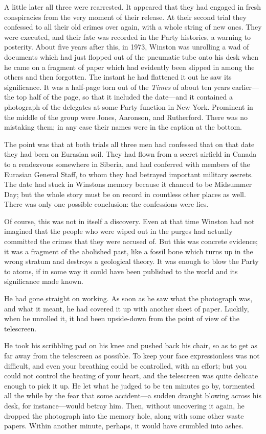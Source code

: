 A little later all three were rearrested. It appeared that they had
engaged in fresh conspiracies from the very moment of their release. At
their second trial they confessed to all their old crimes over again,
with a whole string of new ones. They were executed, and their fate was
recorded in the Party histories, a warning to posterity. About five
years after this, in 1973, Winston was unrolling a wad of documents
which had just flopped out of the pneumatic tube onto his desk when he
came on a fragment of paper which had evidently been slipped in among
the others and then forgotten. The instant he had flattened it out he
saw its significance. It was a half-page torn out of the \emph{Times} of
about ten years earlier---the top half of the page, so that it included
the date---and it contained a photograph of the delegates at some Party
function in New York. Prominent in the middle of the group were Jones,
Aaronson, and Rutherford. There was no mistaking them; in any case their
names were in the caption at the bottom.

The point was that at both trials all three men had confessed that on
that date they had been on Eurasian soil. They had flown from a secret
airfield in Canada to a rendezvous somewhere in Siberia, and had
conferred with members of the Eurasian General Staff, to whom they had
betrayed important military secrets. The date had stuck in
Winston\textquotesingle s memory because it chanced to be Midsummer Day;
but the whole story must be on record in countless other places as well.
There was only one possible conclusion: the confessions were lies.

Of course, this was not in itself a discovery. Even at that time Winston
had not imagined that the people who were wiped out in the purges had
actually committed the crimes that they were accused of. But this was
concrete evidence; it was a fragment of the abolished past, like a
fossil bone which turns up in the wrong stratum and destroys a
geological theory. It was enough to blow the Party to atoms, if in some
way it could have been published to the world and its significance made
known.

He had gone straight on working. As soon as he saw what the photograph
was, and what it meant, he had covered it up with another sheet of
paper. Luckily, when he unrolled it, it had been upside-down from the
point of view of the telescreen.

He took his scribbling pad on his knee and pushed back his chair, so as
to get as far away from the telescreen as possible. To keep your face
expressionless was not difficult, and even your breathing could be
controlled, with an effort; but you could not control the beating of
your heart, and the telescreen was quite delicate enough to pick it up.
He let what he judged to be ten minutes go by, tormented all the while
by the fear that some accident---a sudden draught blowing across his
desk, for instance---would betray him. Then, without uncovering it
again, he dropped the photograph into the memory hole, along with some
other waste papers. Within another minute, perhaps, it would have
crumbled into ashes.

